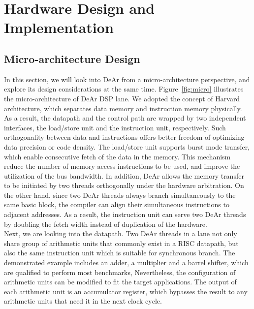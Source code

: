 

\section{Hardware Design and Implementation}
\subsection{Micro-architecture Design}
In this section, we will look into DeAr from a micro-architecture perspective, and explore its design considerations at the same time.
Figure~\ref{fig:micro} illustrates the micro-architecture of DeAr DSP lane.
We adopted the concept of Harvard architecture, 
which separates data memory and instruction memory physically\cite{harvard}.
As a result, the datapath and the control path are wrapped by two independent interfaces, the load/store unit and the instruction unit, respectively.
Such orthogonality between data and instructions offers better freedom of optimizing data precision or code density.
The load/store unit supports burst mode transfer, which enable consecutive fetch of the data in the memory.
This mechanism reduce the number of memory access instructions to be used, 
and improve the utilization of the bus bandwidth.
In addition, DeAr allows the memory transfer to be initiated by two threads orthogonally under the hardware arbitration.
On the other hand, since two DeAr threads always branch simultaneously to the same basic block, 
the compiler can align their simultaneous instructions to adjacent addresses.
As a result, the instruction unit can serve two DeAr threads by doubling the fetch width instead of duplication of the hardware.
\\\indent
Next, we are looking into the datapath.
Two DeAr threads in a lane not only share group of arithmetic units that commonly exist in a RISC datapath, 
but also the same instruction unit which is suitable for synchronous branch.
The demonstrated example includes an adder, a multiplier and a barrel shifter, which are qualified to perform most benchmarks,
Nevertheless, the configuration of arithmetic units can be modified to fit the target applications.
The output of each arithmetic unit is an accumulator register, 
which bypasses the result to any arithmetic units that need it in the next clock cycle.
